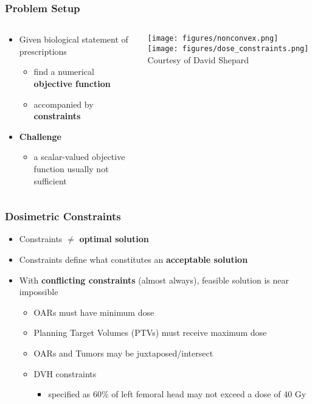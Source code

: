 \begin{frame}
\frametitle{Problem Setup}
\begin{columns}[c]
	\begin{column}{0.45\textwidth}
		\begin{itemize}
			\item Given biological statement of prescriptions %
			\begin{itemize}
				\item find a numerical \textbf{objective function}
				\item accompanied by \textbf{constraints}
			\end{itemize}
			\item \textbf{Challenge}
			\begin{itemize}
				\item a scalar-valued objective function usually not sufficient %
			\end{itemize}
		\end{itemize}
	\end{column}
	\begin{column}{0.45\textwidth}
		\texttt{[image: figures/nonconvex.png]}
		\texttt{[image: figures/dose\_constraints.png]}
		\\ \tiny \centering Courtesy of David Shepard
	\end{column}
\end{columns}
\end{frame}

\begin{frame}
\frametitle{Dosimetric Constraints}
\begin{itemize}
	\item Constraints $\neq$ \textbf{optimal solution} 
	\item  Constraints define what constitutes an \textbf{acceptable solution}
	\item With \textbf{conflicting constraints} (almost always), feasible solution is near impossible
	\begin{itemize}
		\item OARs must have minimum dose
		\item Planning Target Volumes (PTVs) must receive maximum dose
		\item OARs and Tumors may be juxtaposed/intersect 
		\item DVH constraints 
		\begin{itemize}
			\item \eg specified as  60\% of left femoral head may not exceed a dose of 40 Gy	
		\end{itemize}%
	\end{itemize}
	
\end{itemize}
\end{frame}

